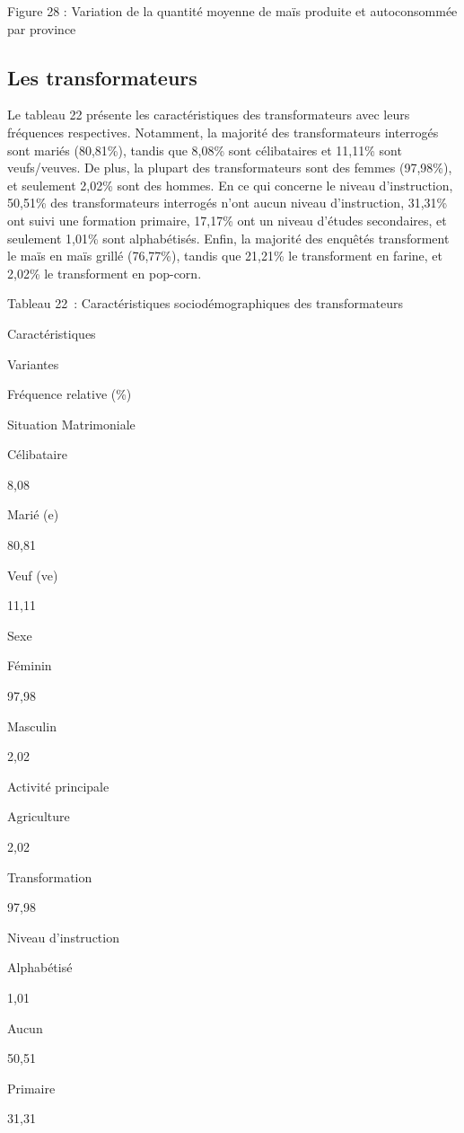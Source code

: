 \documentclass[12pt,oneside]{report}
\begin{document}
Figure 28 : Variation de la quantité moyenne de maïs produite et autoconsommée par province

\subsection{Les transformateurs}
Le tableau 22 présente les caractéristiques des transformateurs avec leurs fréquences respectives. Notamment, la majorité des transformateurs interrogés sont mariés (80,81\%), tandis que 8,08\% sont célibataires et 11,11\% sont veufs/veuves. De plus, la plupart des transformateurs sont des femmes (97,98\%), et seulement 2,02\% sont des hommes. En ce qui concerne le niveau d'instruction, 50,51\% des transformateurs interrogés n'ont aucun niveau d'instruction, 31,31\% ont suivi une formation primaire, 17,17\% ont un niveau d'études secondaires, et seulement 1,01\% sont alphabétisés. Enfin, la majorité des enquêtés transforment le maïs en maïs grillé (76,77\%), tandis que 21,21\% le transforment en farine, et 2,02\% le transforment en pop-corn.

Tableau 22 : Caractéristiques sociodémographiques des transformateurs

Caractéristiques

Variantes

Fréquence relative (\%)

Situation Matrimoniale

Célibataire

8,08

Marié (e)

80,81

Veuf (ve)

11,11

Sexe

Féminin

97,98

Masculin

2,02

Activité principale

Agriculture

2,02

Transformation

97,98

Niveau d'instruction

Alphabétisé

1,01

Aucun

50,51

Primaire

31,31
\end{document}
